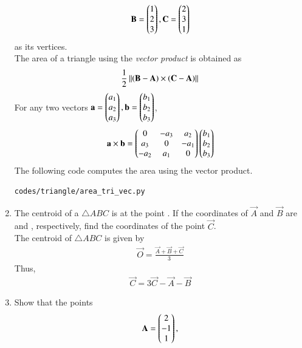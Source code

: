 \begin{enumerate}[label=\arabic*.,ref=\thesubsection.\theenumi]
\begin{align}
\mathbf{B} = \begin{pmatrix}1\\2 \\3\end{pmatrix},
\mathbf{C} = \begin{pmatrix}2\\ 3\\1\end{pmatrix}
\end{align}
%
as its vertices.
\\
\solution The area of a triangle using the {\em vector product} is obtained as
\begin{align}
\frac{1}{2}\left\lVert\left(\mathbf{B}-\mathbf{A}\right)\times \left(\mathbf{C}-\mathbf{A}\right)\right\rVert
\end{align}
%
For any two vectors $\mathbf{a}=\begin{pmatrix}a_1\\a_2\\a_3\end{pmatrix}, \mathbf{b}=\begin{pmatrix}b_1\\b_2\\b_3\end{pmatrix}$, 
\begin{align}
\label{eq:tri_cross_prod}
\mathbf{a}\times \mathbf{b} = \begin{pmatrix}0 & -a_3 & a_2 \\ a_3 & 0 & -a_1 \\ -a_2 & a_1 & 0\end{pmatrix}\begin{pmatrix}b_1\\b_2\\b_3\end{pmatrix}
\end{align}
%
The following code computes the area using the vector product.
%
\begin{lstlisting}
codes/triangle/area_tri_vec.py
\end{lstlisting}
%
%
\item The centroid of a $\triangle ABC$ is at the point .  If the coordinates of $\vec{A}$ and $\vec{B}$ are  and , respectively, find the coordinates of the point $\vec{C}$.
%
\\
\solution The centroid of $\triangle ABC$ is given by
\begin{align}
\label{eq:tri_geo_ex_centroid}
\vec{O} = \frac{\vec{A}+\vec{B}+\vec{C}}{3}
\end{align}
%
Thus, 
\begin{align}
\vec{C} = 3\vec{C}-\vec{A}-\vec{B}
\end{align}
%
\item Show that the points 
\begin{align}
\vec{A} = \myvec{2\\-1 \\1},

\end{align}
\end{enumerate}
